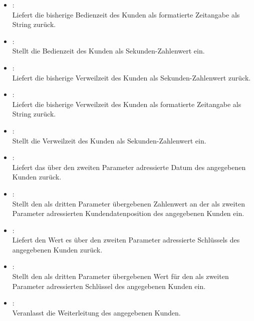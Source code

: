 \begin{itemize}
\item
{}:\\
Liefert die bisherige Bedienzeit des Kunden als formatierte Zeitangabe als String zurück.

\item
{}:\\
Stellt die Bedienzeit des Kunden als Sekunden-Zahlenwert ein.

\item
{}:\\
Liefert die bisherige Verweilzeit des Kunden als Sekunden-Zahlenwert zurück.

\item
{}:\\
Liefert die bisherige Verweilzeit des Kunden als formatierte Zeitangabe als String zurück.

\item
{}:\\
Stellt die Verweilzeit des Kunden als Sekunden-Zahlenwert ein.

\item
{}:\\
Liefert das über den zweiten Parameter adressierte Datum des angegebenen Kunden zurück.

\item
{}:\\
Stellt den als dritten Parameter übergebenen Zahlenwert an der als zweiten Parameter adressierten Kundendatenposition des angegebenen Kunden ein.

\item
{}:\\
Liefert den Wert es über den zweiten Parameter adressierte Schlüssels des angegebenen Kunden zurück.

\item
{}:\\
Stellt den als dritten Parameter übergebenen Wert für den als zweiten Parameter adressierten Schlüssel des angegebenen Kunden ein.

\item
{}:\\
Veranlasst die Weiterleitung des angegebenen Kunden.

\end{itemize}



